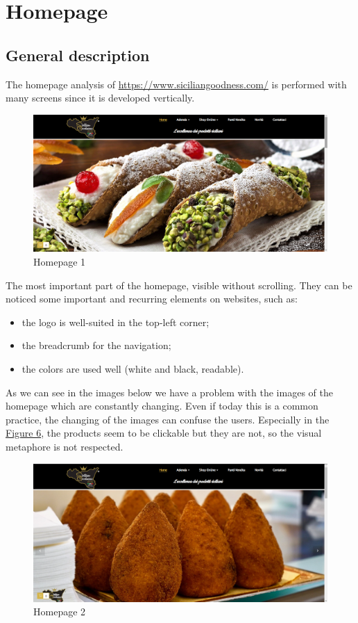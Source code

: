\section{Homepage}

\subsection{General description}
The homepage analysis of \url{https://www.siciliangoodness.com/} is performed with many screens since it is developed vertically.

	\begin{figure}[H]
	\centering\includegraphics[width=12cm]{Img/hom1.png}
	\caption{Homepage 1}
	\end{figure}

The most important part of the homepage, visible without scrolling. They can be noticed some important and recurring elements on websites, such as:

\begin{itemize}
	\item the logo is well-suited in the top-left corner;
	\item the breadcrumb for the navigation;
	\item the colors are used well (white and black, readable).
\end{itemize}

As we can see in the images below we have a problem with the images of the homepage which are constantly changing. 
Even if today this is a common practice, the changing of the images can confuse the users.
Especially in the \hyperlink{hom5}{Figure 6}, the products seem to be clickable but they are not, so the visual metaphore is not respected. \newline

\begin{figure}[H]
	\centering\includegraphics[width=12cm]{Img/hom2.png}
	\caption{Homepage 2}
\end{figure}

